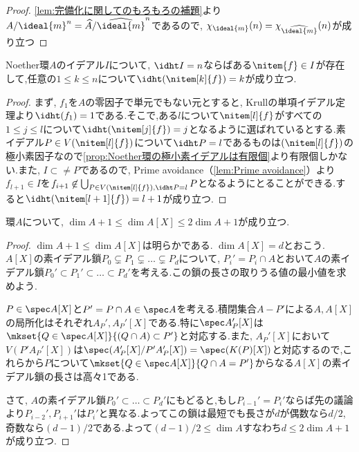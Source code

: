 \begin{proof}
	\ref{lem:完備化に関してのもろもろの補題}より$A/\ideal{m}^n=\widehat{A}/{\widehat{\ideal{m}}}^n$であるので, $\chi_{\ideal{m}}(n)=\chi_{\widehat{\ideal{m}}}(n)$が成り立つ
\end{proof}

\begin{prop}
	Noether環$A$のイデアル$I$について, $\idht I=n$ならばある$\nitem{f}\in I$が存在して,任意の$1\leq k\leq n$について$\idht (\nitem[k]{f})=k$が成り立つ.
\end{prop}

\begin{proof}
	まず, $f_1$を$A$の零因子で単元でもない元とすると, Krullの単項イデアル定理より$\idht (f_1)=1$である.そこで,ある$l$について$\nitem[l]{f}$がすべての$1\leq j\leq l$について$\idht (\nitem[j]{f})=j$となるように選ばれているとする.素イデアル$P\in V(\nitem[l]{f})$について$\idht P=l$であるものは$(\nitem[l]{f})$の極小素因子なので\ref{prop:Noether環の極小素イデアルは有限個}より有限個しかない.また, $I\subset\neq P$であるので, Prime avoidance（\ref{lem:Prime avoidance}）より$f_{l+1}\in I$を$f_{i+1}\not\in\bigcup_{P\in V(\nitem[l]{f}),\idht P=l} P$となるようにとることができる.すると$\idht (\nitem[l+1]{f})=l+1$が成り立つ.
\end{proof}

\begin{thm}
	環$A$について, $\dim A+1\leq\dim A[X]\leq 2\dim A+1$が成り立つ.
\end{thm}

\begin{proof}
	$\dim A+1\leq\dim A[X]$は明らかである. $\dim A[X]=d$とおこう. $A[X]$の素イデアル鎖$P_0\subsetneq P_1\subsetneq\dots\subsetneq P_d$について, $P_i'=P_i\cap A$とおいて$A$の素イデアル鎖$P_0'\subset P_1'\subset\dots\subset P_d'$を考える.この鎖の長さの取りうる値の最小値を求めよう.
	
	$P\in\spec A[X]$と$P'=P\cap A\in\spec A$を考える.積閉集合$A-P'$による$A,A[X]$の局所化はそれぞれ$A_P',A_P'[X]$である.特に$\spec A_P'[X]$は$\mkset{Q\in\spec A[X]}{(Q\cap A)\subset P'}$と対応する.また, $A_P'[X]$において$V(P'A_P'[X])$は$\spec (A_P'[X]/P'A_P'[X])=\spec (K(P)[X])$と対応するので,これらから$P$について$\mkset{Q\in\spec A[X]}{Q\cap A=P'}$からなる$A[X]$の素イデアル鎖の長さは高々1である.
	
	さて, $A$の素イデアル鎖$P_0'\subset\dots\subset P_d'$にもどると,もし$P_{i-1}'=P_i'$ならば先の議論より$P_{i-2}',P_{i+1}'$は$P_i'$と異なる.よってこの鎖は最短でも長さが$d$が偶数なら$d/2$, 奇数なら$(d-1)/2$である.よって$(d-1)/2\leq \dim A$すなわち$d\leq 2\dim A+1$が成り立つ.
\end{proof}

